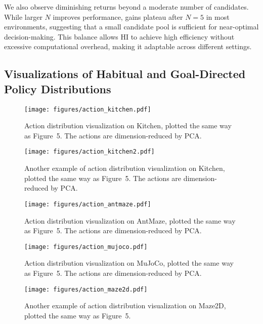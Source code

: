 We also observe diminishing returns beyond a moderate number of candidates. While larger $N$ improves performance, gains plateau after $N=5$ in most environments, suggesting that a small candidate pool is sufficient for near-optimal decision-making. This balance allows HI to achieve high efficiency without excessive computational overhead, making it adaptable across different settings.



\newpage
\subsection{Visualizations of Habitual and Goal-Directed Policy Distributions}
\label{appendix:more_visual}

\begin{figure}[h]
    \centering
    \texttt{[image: figures/action\_kitchen.pdf]}
    \caption{Action distribution visualization on Kitchen, plotted the same way as Figure~5. The actions are dimension-reduced by PCA.}
    \label{fig:action_kitchen1}
\end{figure}

\begin{figure}[h]
    \centering
    \texttt{[image: figures/action\_kitchen2.pdf]}
    \caption{Another example of action distribution visualization on Kitchen, plotted the same way as Figure~5. The actions are dimension-reduced by PCA.}
    \label{fig:action_kitchen2}
\end{figure}



\begin{figure}[h]
    \centering
    \texttt{[image: figures/action\_antmaze.pdf]}
    \caption{Action distribution visualization on AntMaze, plotted the same way as Figure~5. The actions are dimension-reduced by PCA.}
    \label{fig:action_antmaze}
\end{figure}


\begin{figure}[h]
    \centering
    \texttt{[image: figures/action\_mujoco.pdf]}
    \caption{Action distribution visualization on MuJoCo, plotted the same way as Figure~5. The actions are dimension-reduced by PCA.}
    \label{fig:action_mujoco}
\end{figure}

\begin{figure}[h]
    \centering
    \texttt{[image: figures/action\_maze2d.pdf]}
    \caption{Another example of action distribution visualization on Maze2D, plotted the same way as Figure~5.}
    \label{fig:action_maze2d2}
\end{figure}

